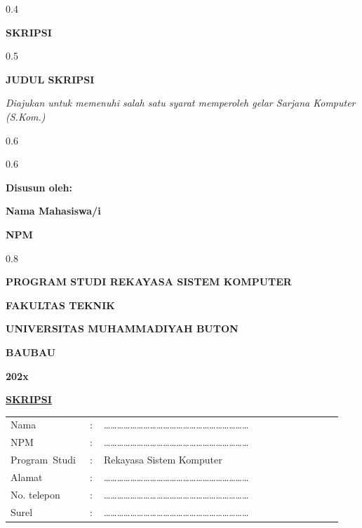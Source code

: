\thispagestyle{empty}
\begin{ruang}{0.4}\end{ruang}
\begin{sampulbesar}
\textbf{SKRIPSI}
\end{sampulbesar}
\begin{ruang}{0.5}\end{ruang}
\begin{sampulbesar}
\textbf{JUDUL SKRIPSI}
\end{sampulbesar}
\begin{sampulsedang}
\textit{Diajukan untuk memenuhi salah satu syarat memperoleh gelar Sarjana Komputer (S.Kom.)}
\end{sampulsedang}
\begin{ruang}{0.6}\end{ruang}
\begin{tengah}
\logo{4.5cm}
\end{tengah}
\begin{ruang}{0.6}\end{ruang}
\begin{sampulsedang}
\textbf{Disusun oleh:}

\textbf{Nama Mahasiswa/i}

\textbf{NPM}
\end{sampulsedang}
\begin{ruang}{0.8}\end{ruang}
\begin{sampulsedang}
\textbf{PROGRAM STUDI REKAYASA SISTEM KOMPUTER}

\textbf{FAKULTAS TEKNIK}

\textbf{UNIVERSITAS MUHAMMADIYAH BUTON}

\textbf{BAUBAU}

\textbf{202x}
\end{sampulsedang}
\begin{halamanbaru}\end{halamanbaru}

\thispagestyle{empty}
\begin{tengah}
\textbf{\underline{SKRIPSI}}
\end{tengah}

\begin{tanpagaris}
\begin{longtable}{@{}p{0.22\linewidth}p{0.04\linewidth}p{0.68\linewidth}@{}}
Nama & : & ………………………………………………………… \\[6pt]
NPM & : & ………………………………………………………… \\[6pt]
\mbox{Program Studi} & : & Rekayasa Sistem Komputer \\[6pt]
Alamat & : & ………………………………………………………… \\[6pt]
No. telepon & : & ………………………………………………………… \\[6pt]
Surel & : & ………………………………………………………… \\
\end{longtable}
\end{tanpagaris}

